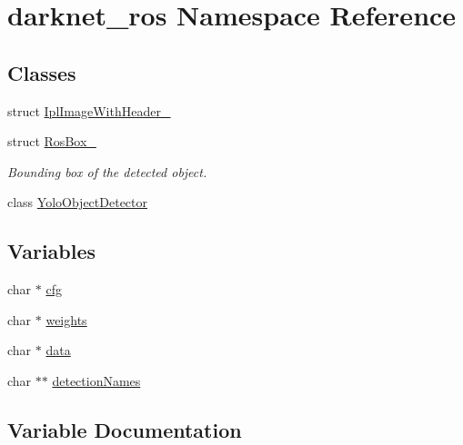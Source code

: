\hypertarget{namespacedarknet__ros}{}\section{darknet\+\_\+ros Namespace Reference}
\label{namespacedarknet__ros}
\subsection*{Classes}
\begin{DoxyCompactItemize}
\item 
struct \mbox{\hyperlink{structdarknet__ros_1_1IplImageWithHeader__}{Ipl\+Image\+With\+Header\+\_\+}}
\item 
struct \mbox{\hyperlink{structdarknet__ros_1_1RosBox__}{Ros\+Box\+\_\+}}
\begin{DoxyCompactList}\small\item\em Bounding box of the detected object. \end{DoxyCompactList}\item 
class \mbox{\hyperlink{classdarknet__ros_1_1YoloObjectDetector}{Yolo\+Object\+Detector}}
\end{DoxyCompactItemize}
\subsection*{Variables}
\begin{DoxyCompactItemize}
\item 
char $\ast$ \mbox{\hyperlink{namespacedarknet__ros_ae5d28888b7249f93f6b948b8d0e8c4bb}{cfg}}
\item 
char $\ast$ \mbox{\hyperlink{namespacedarknet__ros_a9219776bc505d5963fc6920fbe7697e8}{weights}}
\item 
char $\ast$ \mbox{\hyperlink{namespacedarknet__ros_a1647c10e0e841a6a137fff4f9df7c1d7}{data}}
\item 
char $\ast$$\ast$ \mbox{\hyperlink{namespacedarknet__ros_ae35d4964f842a9cd96ed82479484f7f2}{detection\+Names}}
\end{DoxyCompactItemize}


\subsection{Variable Documentation}
\mbox{\label{namespacedarknet__ros_ae5d28888b7249f93f6b948b8d0e8c4bb}} 
